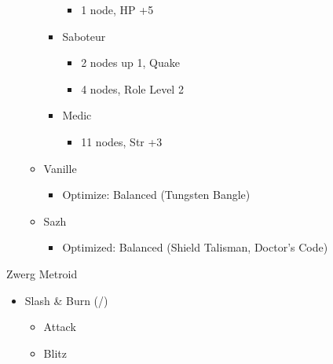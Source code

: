 \begin{menu}
\begin{itemize}
\begin{itemize}
\begin{itemize}
\begin{itemize}
						                  \item 1 node, HP +5
					                  \end{itemize}
					            \item Saboteur
					                  \begin{itemize}
						                  \item 2 nodes up 1, Quake
						                  \item 4 nodes, Role Level 2
					                  \end{itemize}
					            \item Medic
					                  \begin{itemize}
						                  \item 11 nodes, Str +3
					                  \end{itemize}
				            \end{itemize}
			      \end{itemize}
			      \columnbreak
			      \equip
			      \begin{itemize}
				      \item Vanille
				            \begin{itemize}
					            \item \begin{flushleft}Optimize: Balanced (Tungsten Bangle)\end{flushleft}
				            \end{itemize}
				      \item Sazh
				            \begin{itemize}
					            \item \begin{flushleft}Optimized: Balanced (Shield Talisman, Doctor's Code)\end{flushleft}
				            \end{itemize}
			      \end{itemize}
		\end{itemize}
	\end{menu}
	\renewcommand{\first}{[1] Slash \& Burn (\com/\rav)}
	\renewcommand{\second}{[2] War \& Peace (\com/\med)}
	\renewcommand{\third}{[3] Tide Turner (\syn/\sab)}
	\renewcommand{\fourth}{[4] }
	\renewcommand{\fifth}{[5] Undermine (\rav/\sab)}
	\renewcommand{\sixth}{[6] Divide \& Conquer (\com/\sab)}

	\begin{battle}[0:06]{Zwerg Metroid}
		\begin{itemize}
			\item \first
			      \begin{itemize}
				      \item Attack
				      \item Blitz
			      \end{itemize}
		\end{itemize}
	\end{battle}

